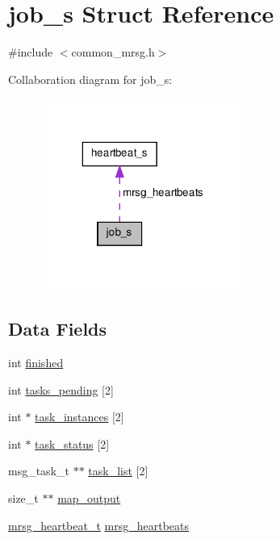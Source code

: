 \hypertarget{structjob__s}{\section{job\-\_\-s \-Struct \-Reference}
\label{structjob__s}
}


{\ttfamily \#include $<$common\-\_\-mrsg.\-h$>$}



\-Collaboration diagram for job\-\_\-s\-:
\nopagebreak
\begin{figure}[H]
\begin{center}
\leavevmode
\includegraphics[width=193pt]{structjob__s__coll__graph}
\end{center}
\end{figure}
\subsection*{\-Data \-Fields}
\begin{DoxyCompactItemize}
\item 
int \hyperlink{structjob__s_ab8937d6bc68b0fc735d85461886a5d81}{finished}
\item 
int \hyperlink{structjob__s_a2121f93a58679fe228efdefe7bdcd1ba}{tasks\-\_\-pending} \mbox{[}2\mbox{]}
\item 
int $\ast$ \hyperlink{structjob__s_a511f43e33a73ddbda1ec080c2f972e33}{task\-\_\-instances} \mbox{[}2\mbox{]}
\item 
int $\ast$ \hyperlink{structjob__s_a25c05f7bc2c55b8626a947c42fbea207}{task\-\_\-status} \mbox{[}2\mbox{]}
\item 
msg\-\_\-task\-\_\-t $\ast$$\ast$ \hyperlink{structjob__s_a30c1a20fc86906cb521672940ff65c0f}{task\-\_\-list} \mbox{[}2\mbox{]}
\item 
size\-\_\-t $\ast$$\ast$ \hyperlink{structjob__s_aaf7015affb185128aab0ad5420310c74}{map\-\_\-output}
\item 
\hyperlink{common__mrsg_8h_af48c477b08552c23ed34146ca7c5cbde}{mrsg\-\_\-heartbeat\-\_\-t} \hyperlink{structjob__s_a062d47dd9bfaf84c6558e0fd08dd4b8a}{mrsg\-\_\-heartbeats}
\end{DoxyCompactItemize}


